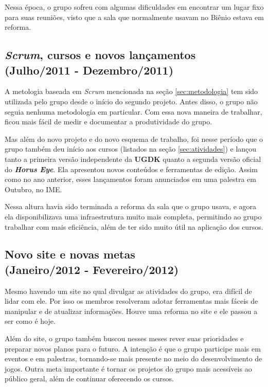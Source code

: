 \documentclass[12pt,onecolumn,a4paper]{article}
\begin{document}
        Nessa época, o grupo sofreu com algumas dificuldades em encontrar um lugar fixo para suas
        reuniões, visto que a sala que normalmente usavam no Biênio estava em reforma.

    \clearpage
    \subsection{\textit{Scrum}, cursos e novos lançamentos \\
                {\small(Julho/2011 - Dezembro/2011)} }
        A metologia baseada em \textit{Scrum} mencionada na seção \ref{sec:metodologia} tem sido
        utilizada pelo grupo desde o início do segundo projeto. Antes disso, o grupo não seguia
        nenhuma metodologia em particular. Com essa nova maneira de trabalhar, ficou mais fácil de
        medir e documentar a produtividade do grupo.
        
        Mas além do novo projeto e do novo esquema de trabalho, foi nesse período que o grupo também
        deu início aos cursos (listados na seção \ref{sec:atividades}) e lançou tanto a primeira
        versão independente da \textbf{UGDK} quanto a segunda versão oficial do
        \textit{\textbf{Horus Eye}}. Ela apresentou novos conteúdos e ferramentas de edição. Assim
        como no ano anterior, esses lançamentos foram anunciados em uma palestra em Outubro, no IME.
        
        Nessa altura havia sido terminada a reforma da sala que o grupo usava, e agora ela
        disponibilizava uma infraestrutura muito mais completa, permitindo ao grupo trabalhar com
        mais eficiência, além de ter sido muito útil na aplicação dos cursos.

    \clearpage
    \subsection{Novo site e novas metas \\
                {\small(Janeiro/2012 - Fevereiro/2012)} }
        Mesmo havendo um site no qual divulgar as atividades do grupo, era difícil de lidar com ele.
        Por isso os membros resolveram adotar ferramentas mais fáceis de manipular e de atualizar
        informações. Houve uma reforma no site e ele passou a ser como é hoje.
        
        Além do site, o grupo também buscou nesses meses rever suas prioridades e preparar novos
        planos para o futuro. A intenção é que o grupo participe mais em eventos e em palestras,
        tornando-se mais presente no meio do desenvolvimento de jogos. Outra meta importante é
        tornar os projetos do grupo mais acessíveis ao público geral, além de continuar oferecendo
        os cursos.
\end{document}
